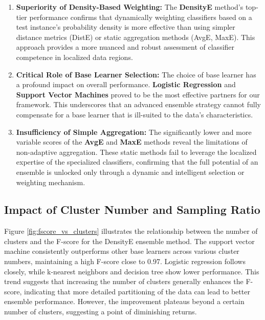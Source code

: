 \documentclass[lettersize,journal]{IEEEtran}
\begin{document}
	\begin{enumerate}
		\item \textbf{Superiority of Density-Based Weighting:} The \textbf{DensityE} method's top-tier performance confirms that dynamically weighting classifiers based on a test instance's probability density is more effective than using simpler distance metrics (DistE) or static aggregation methods (AvgE, MaxE). This approach provides a more nuanced and robust assessment of classifier competence in localized data regions.
		
		\item \textbf{Critical Role of Base Learner Selection:} The choice of base learner has a profound impact on overall performance. \textbf{Logistic Regression} and \textbf{Support Vector Machines} proved to be the most effective partners for our framework. This underscores that an advanced ensemble strategy cannot fully compensate for a base learner that is ill-suited to the data's characteristics.
		
		\item \textbf{Insufficiency of Simple Aggregation:} The significantly lower and more variable scores of the \textbf{AvgE} and \textbf{MaxE} methods reveal the limitations of non-adaptive aggregation. These static methods fail to leverage the localized expertise of the specialized classifiers, confirming that the full potential of an ensemble is unlocked only through a dynamic and intelligent selection or weighting mechanism.
	\end{enumerate}
	
	\subsection{Impact of Cluster Number and Sampling Ratio}
	
	\noindent Figure \ref{fig:fscore_vs_clusters} illustrates the relationship between the number of clusters and
	the F-score for the DensityE ensemble method. The support vector machine
	consistently outperforms other base learners across various cluster numbers,
	maintaining a high F-score close to 0.97. Logistic regression follows closely,
	while k-nearest neighbors and decision tree show lower performance. This
	trend suggests that increasing the number of clusters generally enhances the
	F-score, indicating that more detailed partitioning of the data can lead to
	better ensemble performance. However, the improvement plateaus beyond a
	certain number of clusters, suggesting a point of diminishing returns.
	
\end{document}
